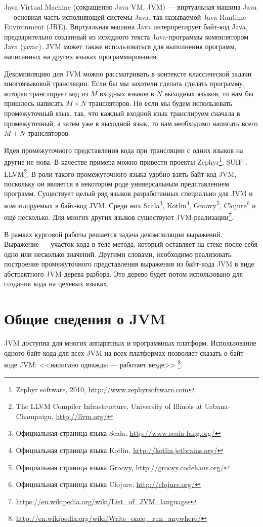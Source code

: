 Java Virtual Machine (сокращенно Java VM, JVM) \cite{jvms} --- виртуальная машина Java --- основная часть исполняющей системы Java, так называемой Java Runtime Environment (JRE). Виртуальная машина Java интерпретирует байт-код Java, предварительно созданный из исходного текста Java-программы компилятором Java (javac). JVM может также использоваться для выполнения программ, написанных на других языках программирования.

Декомпиляцию для JVM можно рассматривать в контексте классической задачи многоязыковой трансляции. Если бы мы захотели сделать сделать программу, которая транслирует код из $M$ входных языков в $N$ выходных языков, то нам бы пришлось написать $M\times N$ трансляторов. Но если мы будем использовать промежуточный язык, так, что каждый входной язык транслируем сначала в промежуточный, а затем уже в выходной язык, то нам необходимо написать всего $M + N$ трансляторов. 

Идея промежуточного представления кода при трансляции с одних языков на другие не нова. В качестве примера можно привести проекты Zephyr\footnote{Zephyr software, 2010, \url{http://www.zephyrsoftware.com}}, SUIF \cite{book:suif}, LLVM\footnote{The LLVM Compiler Infrastructure, University of Illinois at Urbana-Champaign, \url{http://llvm.org/}}. 
В роли такого промежуточного языка удобно взять байт-код JVM, поскольку он является в некотором роде универсальным представлением программ. Существует целый ряд языков разработанных специально для JVM и компилируемых в байт-код JVM. Среди них Scala\footnote{Официальная страница языка Scala, \url{http://www.scala-lang.org/}}, Kotlin\footnote{Официальная страница языка Kotlin, \url{http://kotlin.jetbrains.org/}}, Groovy\footnote{Официальная страница языка Groovy, \url{http://groovy.codehaus.org/}}, Clojure\footnote{Официальная страница языка Clojure, \url{http://clojure.org/}} и ещё несколько. Для многих других языков существуют JVM-реализации\footnote{\url{https://en.wikipedia.org/wiki/List\_of\_JVM\_languages}}. 


В рамках курсовой работы решается задача декомпиляции выражений. Выражение --- участок кода в теле метода, который оставляет на стеке после себя одно или несколько значений. Другими словами, необходимо реализовать построение промежуточного представления выражения из байт-кода JVM в виде абстрактного JVM-дерева разбора. Это дерево будет потом использовано для создания кода на целевых языках. 

\section{Общие сведения о JVM}
JVM доступна для многих аппаратных и программных платформ. Использование одного байт-кода для всех JVM на всех платформах позволяет сказать о байт-коде JVM: <<написано однажды --- работает везде>> \footnote{\url{http://en.wikipedia.org/wiki/Write\_once,\_run\_anywhere/}}.

